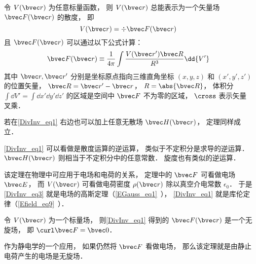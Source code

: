 

\begin{theorem}{}
令 $V(\bvec r)$ 为任意标量函数， 则 $V(\bvec r)$ 总能表示为一个矢量场 $\bvec F(\bvec r)$ 的散度， 即
\begin{equation}\label{DivInv_eq3}
V(\bvec r) = \div \bvec F(\bvec r)
\end{equation}
且 $\bvec F(\bvec r)$ 可以通过以下公式计算：
\begin{equation}\label{DivInv_eq1}
\bvec F(\bvec r) \equiv \frac{1}{4\pi}\int \frac{V(\bvec r') \bvec R}{R^3} \dd{V'}
\end{equation}
其中 $\bvec r, \bvec r'$ 分别是坐标原点指向三维直角坐标 $(x, y, z)$ 和 $(x', y', z')$ 的位置矢量， $\bvec R = \bvec r' - \bvec r$， $R = \abs{\bvec R}$， 体积分 $\int\dd{V'} = \int\dd{x'}\dd{y'}\dd{z'}$ 的区域是空间中 $\bvec F$ 不为零的区域， $\cross$ 表示矢量叉乘．

若在\autoref{DivInv_eq1} 右边也可以加上任意无散场 $\bvec H(\bvec r)$， 定理同样成立．
\end{theorem}

\autoref{DivInv_eq1} 可以看做是散度运算的逆运算， 类似于不定积分是求导的逆运算． $\bvec H(\bvec r)$ 则相当于不定积分中的任意常数． 旋度也有类似的逆运算．

该定理在物理中可应用于电场和电荷的关系， 定理中的 $\bvec F$ 可看做电场 $\bvec E$， 而 $V(\bvec r)$ 可看做电荷密度 $\rho(\bvec r)$ 除以真空介电常数 $\epsilon_0$． 于是\autoref{DivInv_eq3} 就是电场的高斯定理（\autoref{EGauss_eq1}~）， \autoref{DivInv_eq1} 就是库伦定律（\autoref{Efield_eq9}~）．

\begin{theorem}{}\label{DivInv_the1}
令 $V(\bvec r)$ 为一个标量场， 则\autoref{DivInv_eq1} 得到的 $\bvec F(\bvec r)$ 是一个无旋场， 即 $\curl \bvec F = \bvec 0$．
\end{theorem}

作为静电学的一个应用， 如果仍然将 $\bvec F$ 看做电场， 那么该定理就是由静止电荷产生的电场是无旋场．

